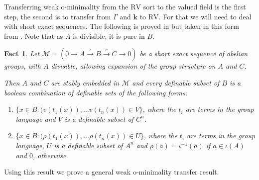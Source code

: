 \documentclass[11pt]{amsart}
\newtheorem{fact}[theorem]{Fact}
\theoremstyle{definition}
\newcommand{\bk}{\textbf{k}}
\newcommand{\CM}{{\mathcal M}}
\newcommand{\0}{\emptyset}
\begin{document}
 
    Transferring weak o-minimality from the $\mathrm{RV}$ sort to the valued field is the first step, the second is to transfer from $\Gamma$ and $\bk$ to $\mathrm{RV}$. For that we will need to deal with short exact sequences.
    The following is proved in \cite{AsChGeZi} but taken in this form from \cite[Fact 1.74]{Touchard}. Note that as $A$ is divisible, it is pure in $B$.

    \begin{fact}\label{F:relQE in short exact}
        Let $\CM=(0\to A\xrightarrow[]{\iota} B\xrightarrow{v}C\to 0)$ be a short exact sequence of abelian groups, with $A$ divisible, allowing expansion of the group structure on $A$ and $C$. 

        Then $A$ and $C$ are stably embedded in $\CM$ and every definable subset of $B$ is a boolean combination of definable sets of the following forms:
        \begin{enumerate}
            \item $\{x\in B: (v(t_1(x)),\dots v(t_n(x))\in V\}$, where the $t_i$ are terms in the group language and $V$ is a definable subset of $C^n$.
            \item $\{x\in B: (\rho(t_1(x)),\dots \rho(t_n(x))\in U\}$, where the $t_i$ are terms in the group language, $U$ is a definable subset of $A^n$ and $\rho(a)=\iota^{-1}(a)$ if $a\in \iota(A)$ and $0$, otherwise.
        \end{enumerate}
    \end{fact}

    Using this result we prove a general weak o-minimality transfer result.
\end{document}
